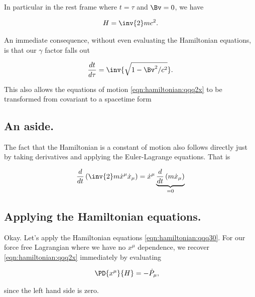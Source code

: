 In particular in the rest frame where $t = \tau$ and $\Bv = 0$, we have

\begin{align}\label{eqn:hamiltonian:qqq11}
H = \inv{2} m c^2.
\end{align}

An immediate consequence, without even evaluating the Hamiltonian equations, is that our $\gamma$ factor falls out

\begin{align}\label{eqn:hamiltonian:qqq12}
\frac{dt}{d\tau} = \inv{\sqrt{1 - \Bv^2/c^2}}.
\end{align}

This also allows the equations of motion \ref{eqn:hamiltonian:qqq2x} to be transformed from covariant to a spacetime form


\subsection{An aside.}

The fact that the Hamiltonian is a constant of motion also follows directly just by taking derivatives and applying the Euler-Lagrange equations.  That is

\begin{align*}
\frac{d}{dt} \left( \inv{2} m \dot{x}^\mu \dot{x}_\mu \right) 
=
\dot{x}^\mu \underbrace{\frac{d}{dt} \left( m \dot{x}_\mu \right)}_{=0} \\
\end{align*}

\subsection{Applying the Hamiltonian equations.}

Okay.  Let's apply the Hamiltonian equations \ref{eqn:hamiltonian:qqq30}.  For our force free Lagrangian where we have no $x^\mu$ dependence, we recover \ref{eqn:hamiltonian:qqq2x} immediately by evaluating

\begin{align}\label{eqn:hamiltonian:qqq30b}
\PD{x^\mu}{H} &= -\dot{P}_\mu,
\end{align}

since the left hand side is zero.

\EndNoBibArticle
